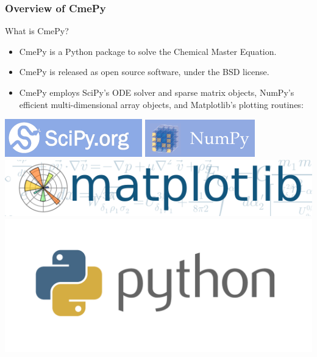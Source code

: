 \documentclass[hyperref={colorlinks=true}]{beamer}
\begin{document}
\begin{frame}
\frametitle{Overview of CmePy}
\begin{block}{What is CmePy?}
\begin{itemize}
\item CmePy is a Python package to solve the Chemical Master Equation.
\item CmePy is released as open source software, under the BSD license.
\item CmePy employs SciPy's ODE solver and sparse matrix objects, NumPy's
efficient multi-dimensional array objects, and Matplotlib's plotting routines:
\end{itemize}
\end{block}
\begin{center}
\includegraphics[height=0.1\textheight]{scipy-logo.png}
\;
\includegraphics[height=0.1\textheight]{numpy-logo.png}
\;
\includegraphics[height=0.1\textheight]{matplotlib-logo.png}
\;
\includegraphics[height=0.1\textheight]{python-logo.png}
\end{center}
\end{frame}
\end{document}
